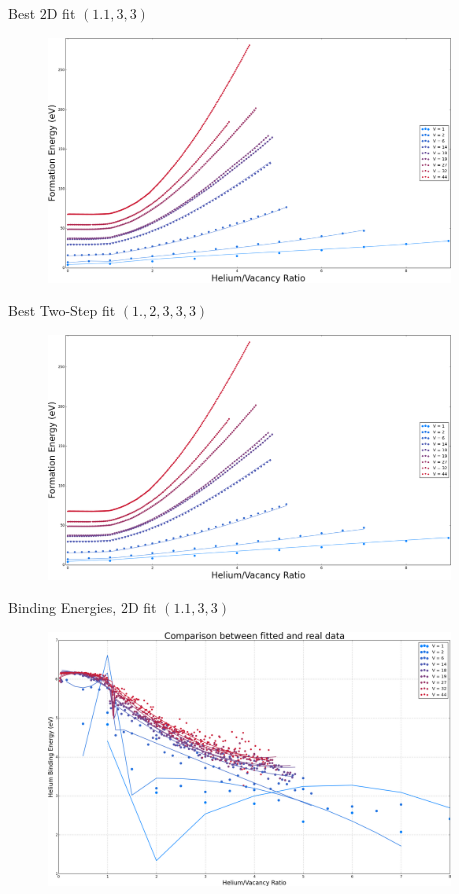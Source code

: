 \documentclass[10pt]{beamer}
\begin{document}
\begin{frame}{Best $2$D fit $(1.1, 3, 3)$}
	\begin{figure}
        \includegraphics[width=0.95\textwidth]{formationFit2D_3311}
    \end{figure}
\end{frame}

\begin{frame}{Best Two-Step fit $(1., 2, 3, 3, 3)$}
	\begin{figure}
        \includegraphics[width=0.95\textwidth]{formationFit1D_23331}
    \end{figure}
\end{frame}

\begin{frame}{Binding Energies, $2$D fit $(1.1, 3, 3)$}
	\begin{figure}
        \includegraphics[width=0.95\textwidth]{bindingFit2D_3311}
    \end{figure}
\end{frame}
\end{document}
